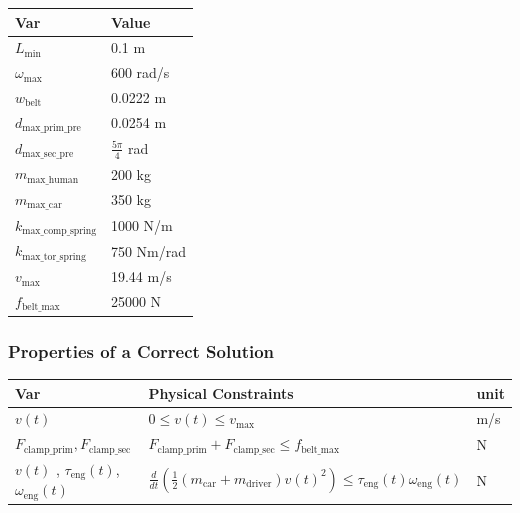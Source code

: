 \documentclass[12pt]{article}
\begin{document}
\noindent

\begin{table}[H]
\caption{Specification Parameter Values} \label{TblSpecParams}
\renewcommand{\arraystretch}{1.2}
\noindent \begin{longtable*}{l l} 
  \toprule
  \textbf{Var} & \textbf{Value} \\
  \midrule 
  $L_\text{min}$ & 0.1 \si{\metre}\\
  $\omega_\text{max}$ & 600 rad/s\\
  $w_\text{belt}$ & 0.0222 m\\
  $d_\text{max\_prim\_pre}$ & 0.0254 m\\
  $d_\text{max\_sec\_pre}$ & $\frac{5\pi}{4}$ rad\\
  $m_\text{max\_human}$ & 200 kg\\
  $m_\text{max\_car}$ & 350 kg\\
  $k_\text{max\_comp\_spring}$ & 1000 N/m\\
  $k_\text{max\_tor\_spring}$ & 750 Nm/rad\\
  $v_\text{max}$ & 19.44 m/s\\
  $f_\text{belt\_max}$ & 25000 N\\
  \bottomrule
\end{longtable*}
\end{table}

\subsubsection{Properties of a Correct Solution} \label{sec_CorrectSolution}

\noindent

\begin{table}[H]
\caption{Output Variables} \label{TblOutputVar}
\renewcommand{\arraystretch}{1.2}
\noindent \begin{longtable*}{l l l} 
  \toprule
  \textbf{Var} & \textbf{Physical Constraints} & \textbf{unit}\\
  \midrule 
  $v(t)$ & $0 \leq v(t) \leq v_\text{max}$& m/s\\
  $F_{\text{clamp\_prim}}, F_{\text{clamp\_sec}}$ & $F_{\text{clamp\_prim}} + F_{\text{clamp\_sec}} \leq f_\text{belt\_max}$ & N \\
  $v(t)$ , $\tau_\text{eng}(t)$,  $\omega_\text{eng}(t)$ & $\frac{d}{dt}(\frac{1}{2}(m_\text{car}+m_\text{driver})v(t)^2) \leq \tau_\text{eng}(t) \omega_\text{eng}(t)$ & N\\
  \bottomrule
\end{longtable*}
\end{table}
\end{document}
